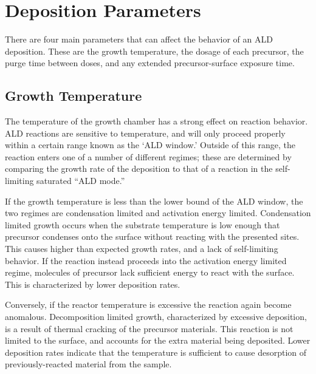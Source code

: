 
\section{Deposition Parameters}
\label{sec:SampFab-DepParams}

There are four main parameters that can affect the behavior of an ALD deposition.  These are the growth temperature, the dosage of each precursor, the purge time between doses, and any extended precursor-surface exposure time. 


\subsection{Growth Temperature}

The temperature of the growth chamber has a strong effect on reaction behavior. ALD reactions are sensitive to temperature, and will only proceed properly within a certain range known as the `ALD window.' Outside of this range, the reaction enters one of a number of different regimes; these are determined by comparing the growth rate of the deposition to that of a reaction in the self-limiting saturated ``ALD mode.'' 

If the growth temperature is less than the lower bound of the ALD window, the two regimes are condensation limited and activation energy limited. Condensation limited growth occurs when the substrate temperature is low enough that precursor condenses onto the surface without reacting with the presented sites. This causes higher than expected growth rates, and a lack of self-limiting behavior. If the reaction instead proceeds into the activation energy limited regime, molecules of precursor lack sufficient energy to react with the surface. This is characterized by lower deposition rates. 

Conversely, if the reactor temperature is excessive the reaction again become anomalous. Decomposition limited growth, characterized by excessive deposition, is a result of thermal cracking of the precursor materials. This reaction is not limited to the surface, and accounts for the extra material being deposited. Lower deposition rates indicate that the temperature is sufficient to cause desorption of previously-reacted material from the sample. 


